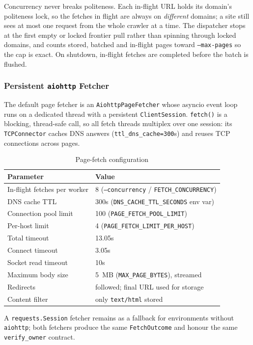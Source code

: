 \documentclass[11pt,a4paper]{article}
\newcommand{\code}[1]{\texttt{#1}}
\begin{document}
Concurrency never breaks politeness. Each in-flight URL holds its domain's politeness lock, so the fetches in flight are always on \emph{different} domains; a site still sees at most one request from the whole crawler at a time. The dispatcher stops at the first empty or locked frontier pull rather than spinning through locked domains, and counts stored, batched and in-flight pages toward \code{--max-pages} so the cap is exact. On shutdown, in-flight fetches are completed before the batch is flushed.

\subsubsection{Persistent \code{aiohttp} Fetcher}

The default page fetcher is an \code{AiohttpPageFetcher} whose asyncio event loop runs on a dedicated thread with a persistent \code{ClientSession}. \code{fetch()} is a blocking, thread-safe call, so all fetch threads multiplex over one session: its \code{TCPConnector} caches DNS answers (\code{ttl\_dns\_cache=300}s) and reuses TCP connections across pages.

\begin{table}[H]
\centering
\caption{Page-fetch configuration}
\begin{tabular}{ll}
\toprule
Parameter & Value \\
\midrule
In-flight fetches per worker & 8 (\code{--concurrency} / \code{FETCH\_CONCURRENCY})\\
DNS cache TTL & 300s (\code{DNS\_CACHE\_TTL\_SECONDS} env var)\\
Connection pool limit & 100 (\code{PAGE\_FETCH\_POOL\_LIMIT})\\
Per-host limit & 4 (\code{PAGE\_FETCH\_LIMIT\_PER\_HOST})\\
Total timeout & 13.05s\\
Connect timeout & 3.05s\\
Socket read timeout & 10s\\
Maximum body size & 5~MB (\code{MAX\_PAGE\_BYTES}), streamed\\
Redirects & followed; final URL used for storage\\
Content filter & only \code{text/html} stored\\
\bottomrule
\end{tabular}
\end{table}

A \code{requests.Session} fetcher remains as a fallback for environments without \code{aiohttp}; both fetchers produce the same \code{FetchOutcome} and honour the same \code{verify\_owner} contract.
\end{document}
